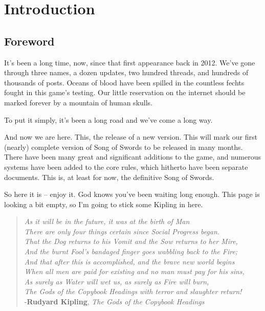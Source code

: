 \documentclass[oneside,11pt,english]{book}
\begin{document}
\chapter{Introduction}\label{ch:intro}
\newlength{\oldintextsep}
\setlength{\oldintextsep}{\intextsep}
\newpage
\section*{Foreword}
It’s been a long time, now, since that first appearance back in 2012. We’ve gone through three names, a dozen updates, two hundred threads, and hundreds of thousands of posts. Oceans of blood have been spilled in the countless fechts fought in this game’s testing. Our little reservation on the internet should be marked forever by a mountain of human skulls.


To put it simply, it’s been a long road and we’ve come a long way.

\noindent And now we are here. This, the release of a new version. This will mark our first (nearly) complete 
version of Song of Swords to be released in many months. There have been many great and significant 
additions to the game, and numerous systems have been added to the core rules, which hitherto have been 
separate documents. This is, at least for now, the definitive Song of Swords. 


So here it is -- enjoy it. God knows you’ve been waiting long enough. This page is looking a bit empty, so 
I’m going to stick some Kipling in here. 
\vspace{0.8 cm}
{\large
\begin{verse}
\emph{As it will be in the future, it was at the birth of Man\\
There are only four things certain since Social Progress began. \\
That the Dog returns to his Vomit and the Sow returns to her Mire,\\
And the burnt Fool's bandaged finger goes wabbling back to the Fire; \\}
\vspace{0.4 cm}
\emph{And that after this is accomplished, and the brave new world begins \\ 
When all men are paid for existing and no man must pay for his sins, \\
As surely as Water will wet us, as surely as Fire will burn, \\ 
The Gods of the Copybook Headings with terror and slaughter return! \\}
\vspace{0.3 cm}
\hfill-\textbf{Rudyard Kipling}, \textit{The Gods of the Copybook Headings} 
\end{verse}}
	\newpage
\end{document}
